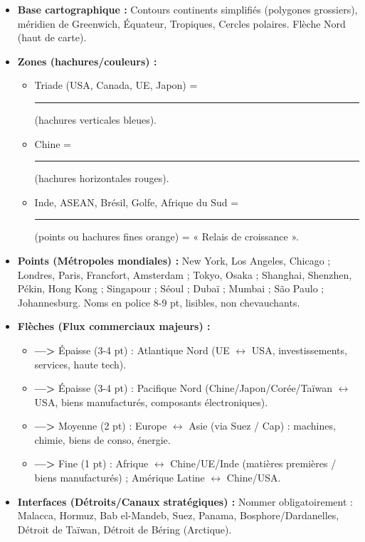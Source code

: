 \documentclass[11pt]{article}
\begin{document}
\begin{corrige}
\begin{itemize}
    \item \textbf{Base cartographique :} Contours continents simplifiés (polygones grossiers), méridien de Greenwich, Équateur, Tropiques, Cercles polaires. Flèche Nord (haut de carte).
    \item \textbf{Zones (hachures/couleurs) :}
        \begin{itemize}
            \item Triade (USA, Canada, UE, Japon) = \textcolor{popblue}{\rule{5pt}{5pt}} (hachures verticales bleues).
            \item Chine = \textcolor{popred}{\rule{5pt}{5pt}} (hachures horizontales rouges).
            \item Inde, ASEAN, Brésil, Golfe, Afrique du Sud = \textcolor{poporange}{\rule{5pt}{5pt}} (points ou hachures fines orange) = « Relais de croissance ».
        \end{itemize}
    \item \textbf{Points (Métropoles mondiales) :} \textcolor{popdark}{\textbullet} New York, Los Angeles, Chicago ; Londres, Paris, Francfort, Amsterdam ; Tokyo, Osaka ; Shanghai, Shenzhen, Pékin, Hong Kong ; Singapour ; Séoul ; Dubaï ; Mumbai ; São Paulo ; Johannesburg. Noms en police 8-9 pt, lisibles, non chevauchants.
    \item \textbf{Flèches (Flux commerciaux majeurs) :}
        \begin{itemize}
            \item \textcolor{popblue}{\textbf{---\textgreater}} Épaisse (3-4 pt) : Atlantique Nord (UE $\leftrightarrow$ USA, investissements, services, haute tech).
            \item \textcolor{popred}{\textbf{---\textgreater}} Épaisse (3-4 pt) : Pacifique Nord (Chine/Japon/Corée/Taïwan $\leftrightarrow$ USA, biens manufacturés, composants électroniques).
            \item \textcolor{poporange}{\textbf{---\textgreater}} Moyenne (2 pt) : Europe $\leftrightarrow$ Asie (via Suez / Cap) : machines, chimie, biens de conso, énergie.
            \item \textcolor{popmuted}{\textbf{---\textgreater}} Fine (1 pt) : Afrique $\leftrightarrow$ Chine/UE/Inde (matières premières / biens manufacturés) ; Amérique Latine $\leftrightarrow$ Chine/USA.
        \end{itemize}
    \item \textbf{Interfaces (Détroits/Canaux stratégiques) :} Nommer obligatoirement : Malacca, Hormuz, Bab el-Mandeb, Suez, Panama, Bosphore/Dardanelles, Détroit de Taïwan, Détroit de Béring (Arctique).

\end{itemize}
\end{corrige}
\end{document}
